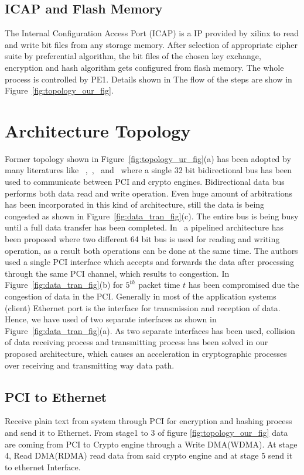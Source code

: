 \documentclass[3p,times]{elsarticle}
\begin{document}
\subsection{ICAP and Flash Memory}
The Internal Configuration Access Port (ICAP) is a IP provided by xilinx to read and write bit files from any storage memory. After selection of appropriate cipher suite by preferential algorithm, the bit files of the chosen key exchange, encryption and hash algorithm gets configured from flash memory. The whole process is controlled by PE1.
Details shown in \cite{xilinx:hwicap}
The flow of the steps are show in Figure~\ref{fig:topology_our_fig}.

\section{Architecture Topology}
Former topology shown in Figure~\ref{fig:topology_ur_fig}(a) has been adopted by many literatures like ~\cite{ieee:six},~\cite{motorola:ssl},~\cite{broadcom:ssl} and~\cite{hifn:ssl} where a single 32 bit bidirectional bus has been used to communicate between PCI and crypto engines. Bidirectional data bus performs both data read and write operation. Even huge amount of arbitrations has been incorporated  in this kind of architecture, still the data is being congested as shown in Figure~\ref{fig:data_tran_fig}(c). The entire bus is being busy until a full data transfer has been completed. In~\cite{ssl:gbps} a pipelined architecture has been proposed where two different 64 bit bus is used for reading and writing operation, as a result both operations can be done at the same time. The authors used a single PCI interface which accepts and forwards the data after processing through the same PCI channel, which results to congestion. In Figure~\ref{fig:data_tran_fig}(b) for $5^{th}$ packet time $t$ has been compromised due the congestion of data in the PCI. Generally in most of the application systems (client) Ethernet port is the interface for transmission and reception of data. Hence, we have used of two separate interfaces as shown in Figure~\ref{fig:data_tran_fig}(a). As two separate interfaces has been used, collision of data receiving process and transmitting process has been solved in our proposed architecture, which causes an acceleration in cryptographic processes over receiving and transmitting way data path.

\subsection{PCI to Ethernet}
Receive plain text from system through PCI for encryption and hashing process and send it to Ethernet. From stage1 to 3 of figure \ref{fig:topology_our_fig} data are coming from PCI to Crypto engine through a Write DMA(WDMA). At stage 4, Read DMA(RDMA) read data from said crypto engine and at stage 5 send it to ethernet Interface.
\end{document}
